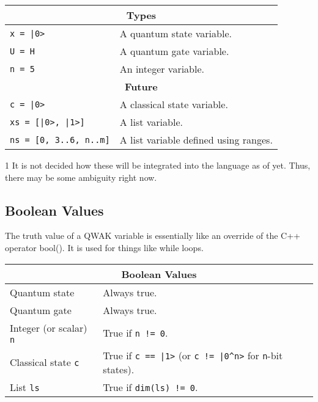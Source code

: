 \documentclass{article}
\begin{document}
\begin{center}
\begin{threeparttable}[b]
\begin{tabular}{| l | l |}
\hline
\multicolumn{2}{|c|}{\textbf{Types}} \\ \hline
\lstinline!x = |0>! & A quantum state variable. \\ \hline
\lstinline!U = H! & A quantum gate variable. \\ \hline
\lstinline!n = 5! & An integer variable. \\ \hline
\multicolumn{2}{|c|}{\textbf{Future\tnote{1}}} \\ \hline
\lstinline!c = |0>! & A classical state variable. \\ \hline
\lstinline!xs = [|0>, |1>]! & A list variable. \\ \hline
\lstinline!ns = [0, 3..6, n..m]! & A list variable defined using ranges. \\ \hline
\end{tabular}
\begin{tablenotes}
\item [1] It is not decided how these will be integrated into the language as of yet. Thus, there may be some ambiguity right now.
\end{tablenotes}
\end{threeparttable}
\end{center}

\subsection{Boolean Values}
The truth value of a QWAK variable is essentially like an override of the C++ operator bool(). It is used for things like while loops.

\begin{center}
\begin{tabular}{| l | l |}
\hline
\multicolumn{2}{|c|}{\textbf{Boolean Values}} \\ \hline
Quantum state & Always true. \\ \hline
Quantum gate & Always true. \\ \hline
Integer (or scalar) \lstinline!n! & True if \lstinline$n != 0$. \\ \hline
Classical state \lstinline!c! & True if \lstinline!c == |1>! (or \lstinline$c != |0^n>$ for \lstinline!n!-bit states). \\ \hline
List \lstinline!ls! & True if \lstinline$dim(ls) != 0$. \\ \hline
\end{tabular}
\end{center}
\end{document}
